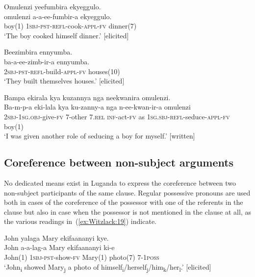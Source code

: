 \documentclass[output=paper,colorlinks,citecolor=brown,
]{langscibook}
\begin{document}
\ex \label{ex:Witzlack:16b}
    \glll Omulenzi yeefumbira ekyeggulo.\\
   omulenzi	a-a-ee-fumbir-a ekyeggulo.\\
    boy(1)	\textsc{1sbj}-\textsc{pst}-\textsc{refl}-cook-\textsc{appl}-\textsc{fv}	dinner(7)\\
    \glt ‘The boy cooked himself dinner.’ [elicited]

\ex \label{ex:Witzlack:16c}
    \glll Beezimbira ennyumba.\\
    ba-a-ee-zimb-ir-a	ennyumba.\\
    \textsc{2sbj}-\textsc{pst}-\textsc{refl}-build-\textsc{appl}-\textsc{fv}	houses(10)\\
    \glt ‘They built themselves houses.’ [elicited]

\ex \label{ex:Witzlack:16d}
    \glll Bampa ekirala kya kuzannya nga neekwanira omulenzi.\\
    Ba-m-p-a eki-lala	kya ku-zanny-a nga	n-ee-kwan-ir-a omulenzi\\
    \textsc{2sbj-1sg.obj}-give-\textsc{fv}	7-other 	\textsc{7.rel} \textsc{inf}-act-\textsc{fv} as		\textsc{1sg.sbj}-\textsc{refl}-seduce-\textsc{appl}-\textsc{fv}	boy(1)\\
    \glt ‘I was given another role of seducing a boy for myself.’ [written]%
    

\z 
\z

\subsection{Coreference between non-subject arguments}\label{sec:Witzlack:4.2}

No dedicated means exist in Luganda to express the coreference between two non-subject participants of the same clause. Regular possessive pronouns are used both in cases of the coreference of the possessor with one of the referents in the clause but also in case when the possessor is not mentioned in the clause at all, as the various readings in~(\ref{ex:Witzlack:19}) indicate.

\ea\label{ex:Witzlack:19}
 
    \glll John yalaga Mary ekifaananyi kye.\\
    John	a-a-lag-a Mary ekifaananyi	ki-e\\
    John(1)	\textsc{1sbj}-\textsc{pst}-show-\textsc{fv}	Mary(1)	photo(7)	\textsc{7-1poss}\\
    \glt ‘John\textsubscript{i} showed Mary\textsubscript{j} a photo of himself\textsubscript{i}/herself\textsubscript{j}/him\textsubscript{k}/her\textsubscript{l}.’ [elicited]
\end{document}
